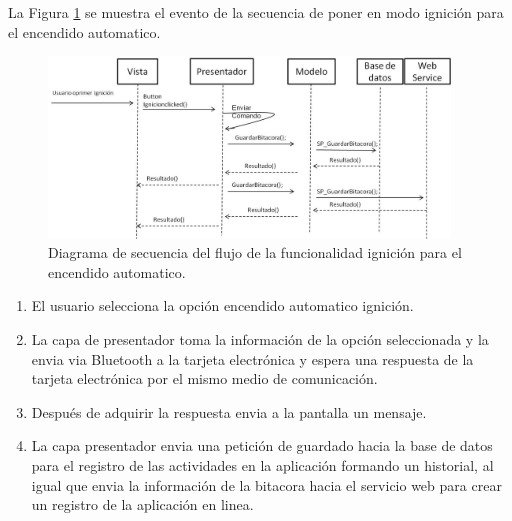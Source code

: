 La Figura \ref{ds11} se muestra el evento de la secuencia de poner en modo ignición para el encendido automatico.\\
\begin{figure}[H]
\centering
\includegraphics[width=0.95\textwidth]{metodologia/DSIgnicion.jpg}
\caption{Diagrama de secuencia del flujo de la funcionalidad ignición para el encendido automatico.}
\label{ds11}
\end{figure}
%
 \begin{enumerate}
\item El usuario selecciona la opción encendido automatico ignición.
\item La capa de presentador toma la información de la opción seleccionada y la envia via Bluetooth a la tarjeta electrónica y espera una respuesta de la tarjeta electrónica por el mismo medio de comunicación.
\item Después de adquirir la respuesta envia a la pantalla un mensaje.
\item La capa presentador envia una petición de guardado hacia la base de datos para el registro de las actividades en la aplicación formando un historial, al igual que envia la información de la bitacora hacia el servicio web para crear un registro de la aplicación en linea.
\end{enumerate}


